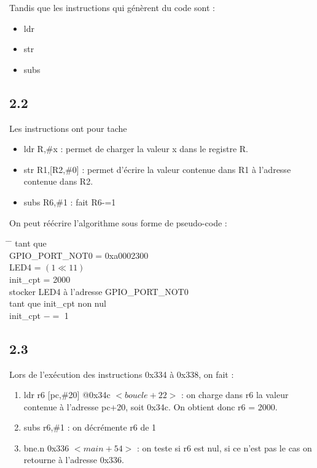 \documentclass[a4paper,12pt,notitlepage,oneside]{article}
\begin{document}
Tandis que les instructions qui génèrent du code sont :

\begin{itemize}
   \item ldr
   \item str
   \item subs
\end{itemize}

\subsection*{2.2}

Les instructions ont pour tache 

\begin{itemize}
   \item ldr R,\#x : permet de charger la valeur x dans le registre R.
   \item str R1,[R2,\#0] : permet d'écrire la valeur contenue dans R1 à l'adresse contenue dans R2.
   \item subs R6,\#1 : fait R6-=1
\end{itemize}

On peut réécrire l'algorithme sous forme de pseudo-code :


\begin{center}
\begin{minipage}{0.6\textwidth} %
\begin{tabbing}
\hspace{1cm} \= \hspace{1cm} \= \kill 
tant que \\
\> GPIO\_PORT\_NOT0 = 0xa0002300 \\
\> LED4 = $(1 \ll 11)$ \\
\> init\_cpt = 2000 \\
\> stocker LED4 à l'adresse GPIO\_PORT\_NOT0 \\
\> tant que init\_cpt non nul  \\
\> \> init\_cpt $-=$ 1
\end{tabbing}
\end{minipage}
\end{center}

\subsection*{2.3}

Lors de l'exécution des instructions 0x334 à 0x338, on fait : 

\begin {enumerate} [start = 334] 
   \item ldr r6 [pc,\#20] @0x34c $<boucle+22>$ : on charge dans r6 la valeur contenue à l'adresse pc+20, soit 0x34c. On obtient donc r6 = 2000.
   \addtocounter{enumi}{1}
   \item subs r6,\#1 : on décrémente r6 de 1 
   \addtocounter{enumi}{1}
   \item bne.n 0x336 $<main+54>$ : on teste si r6 est nul, si ce n'est pas le cas on retourne à l'adresse 0x336.
\end{enumerate}
\end{document}
